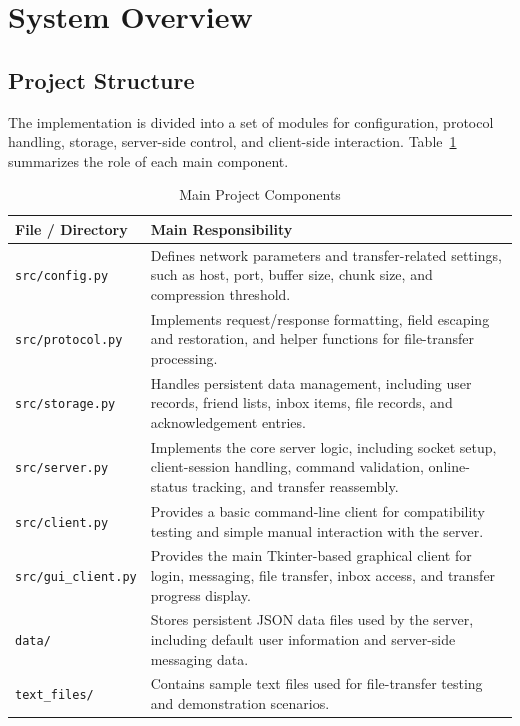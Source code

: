 \documentclass[conference]{IEEEtran}
\begin{document}
\section{System Overview}

\subsection{Project Structure}
The implementation is divided into a set of modules for configuration, protocol handling, storage, server-side control, and client-side interaction. Table~\ref{tab:project-structure} summarizes the role of each main component.

\begin{table}[!t]
	\caption{Main Project Components}
	\label{tab:project-structure}
	\centering
	\footnotesize
	\renewcommand{\arraystretch}{1.15}
	\begin{tabularx}{\columnwidth}{
			>{\raggedright\arraybackslash}p{}
			>{\raggedright\arraybackslash}p{}
		}
		\toprule
		\textbf{File / Directory} & \textbf{Main Responsibility} \\
		\midrule
		\texttt{src/config.py} &
		Defines network parameters and transfer-related settings, such as host, port, buffer size, chunk size, and compression threshold. \\
		
		\texttt{src/protocol.py} &
		Implements request/response formatting, field escaping and restoration, and helper functions for file-transfer processing. \\
		
		\texttt{src/storage.py} &
		Handles persistent data management, including user records, friend lists, inbox items, file records, and acknowledgement entries. \\
		
		\texttt{src/server.py} &
		Implements the core server logic, including socket setup, client-session handling, command validation, online-status tracking, and transfer reassembly. \\
		
		\texttt{src/client.py} &
		Provides a basic command-line client for compatibility testing and simple manual interaction with the server. \\
		
		\texttt{src/gui\_client.py} &
		Provides the main Tkinter-based graphical client for login, messaging, file transfer, inbox access, and transfer progress display. \\
		
		\texttt{data/} &
		Stores persistent JSON data files used by the server, including default user information and server-side messaging data. \\
		
		\texttt{text\_files/} &
		Contains sample text files used for file-transfer testing and demonstration scenarios. \\
		\bottomrule
	\end{tabularx}
\end{table}
\end{document}

